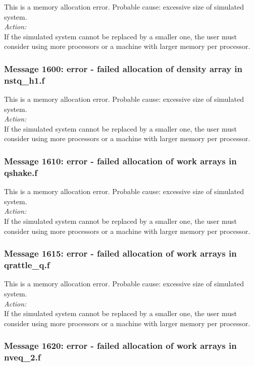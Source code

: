This is a memory allocation error. Probable cause: excessive size of
simulated system. \\

\noindent
{\em Action:}\\
If the simulated system cannot be replaced by a smaller one, the user
must consider using more processors or a machine with larger memory
per processor.

\subsubsection*{Message 1600: error - failed allocation of density
array in nstq\_h1.f}

This is a memory allocation error. Probable cause: excessive size of
simulated system. \\

\noindent
{\em Action:}\\
If the simulated system cannot be replaced by a smaller one, the user
must consider using more processors or a machine with larger memory
per processor.

\subsubsection*{Message 1610: error - failed allocation of work arrays
in qshake.f}

This is a memory allocation error. Probable cause: excessive size of
simulated system. \\

\noindent
{\em Action:}\\
If the simulated system cannot be replaced by a smaller one, the user
must consider using more processors or a machine with larger memory
per processor.

\subsubsection*{Message 1615: error - failed allocation of work arrays
in qrattle\_q.f}

This is a memory allocation error. Probable cause: excessive size of
simulated system. \\

\noindent
{\em Action:}\\
If the simulated system cannot be replaced by a smaller one, the user
must consider using more processors or a machine with larger memory
per processor.

\subsubsection*{Message 1620: error - failed allocation of work arrays
in nveq\_2.f}

